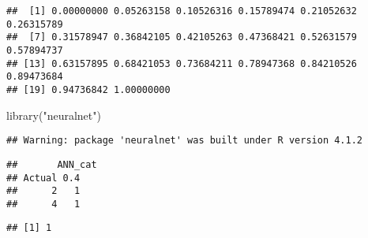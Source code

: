 \documentclass[
]{article}
\newenvironment{Shaded}{\begin{snugshade}}{\end{snugshade}}
\newcommand{\AttributeTok}[1]{\textcolor[rgb]{0.77,0.63,0.00}{#1}}
\newcommand{\CommentTok}[1]{\textcolor[rgb]{0.56,0.35,0.01}{\textit{#1}}}
\newcommand{\DecValTok}[1]{\textcolor[rgb]{0.00,0.00,0.81}{#1}}
\newcommand{\FloatTok}[1]{\textcolor[rgb]{0.00,0.00,0.81}{#1}}
\newcommand{\FunctionTok}[1]{\textcolor[rgb]{0.00,0.00,0.00}{#1}}
\newcommand{\NormalTok}[1]{#1}
\newcommand{\OtherTok}[1]{\textcolor[rgb]{0.56,0.35,0.01}{#1}}
\newcommand{\SpecialCharTok}[1]{\textcolor[rgb]{0.00,0.00,0.00}{#1}}
\newcommand{\StringTok}[1]{\textcolor[rgb]{0.31,0.60,0.02}{#1}}
\begin{document}
\begin{verbatim}
##  [1] 0.00000000 0.05263158 0.10526316 0.15789474 0.21052632 0.26315789
##  [7] 0.31578947 0.36842105 0.42105263 0.47368421 0.52631579 0.57894737
## [13] 0.63157895 0.68421053 0.73684211 0.78947368 0.84210526 0.89473684
## [19] 0.94736842 1.00000000
\end{verbatim}

\begin{Shaded}
\begin{Highlighting}[]
\FunctionTok{library}\NormalTok{(}\StringTok{"neuralnet"}\NormalTok{)}
\end{Highlighting}
\end{Shaded}

\begin{verbatim}
## Warning: package 'neuralnet' was built under R version 4.1.2
\end{verbatim}

\begin{Shaded}
\end{Shaded}

\begin{verbatim}
##       ANN_cat
## Actual 0.4
##      2   1
##      4   1
\end{verbatim}

\begin{Shaded}
\end{Shaded}

\begin{verbatim}
## [1] 1
\end{verbatim}
\end{document}
